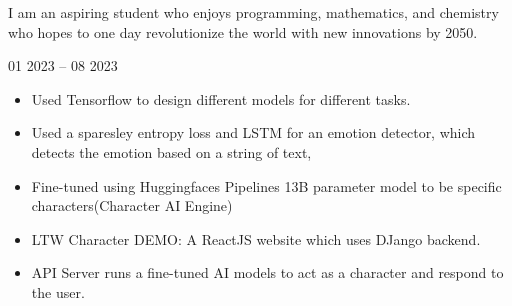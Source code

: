 \documentclass[10pt,a4paper,ragged2e,withhyper]{altacv}
\newenvironment{sloppypar*}{\sloppy\ignorespaces}{\par}
\begin{document}
    \tagline{}

    
    \makecvheader

    \begin{paracol}{2}
        I am an aspiring student who enjoys programming, mathematics, and chemistry who hopes
        to one day revolutionize the world with new innovations by 2050.
        \bigskip
        
        \bigskip
   
        \bigskip
        

            \begin{sloppypar*}
                
                


            \end{sloppypar*}
       
       
        \switchcolumn

         {}{01 2023 -- 08 2023}{}
        \begin{itemize}
            \item Used Tensorflow to design different models for different tasks. 
            \item Used a sparesley entropy loss and LSTM for an emotion detector, which detects the emotion based on a string of text,
            \item Fine-tuned using Huggingfaces Pipelines 13B parameter model to be specific characters(Character AI Engine)
            \item LTW Character DEMO: A ReactJS website which uses DJango backend. 
            \item API Server runs a fine-tuned AI models to act as a character and respond to the user. 
        \end{itemize}
        \divider
        

\end{paracol}
\end{document}
